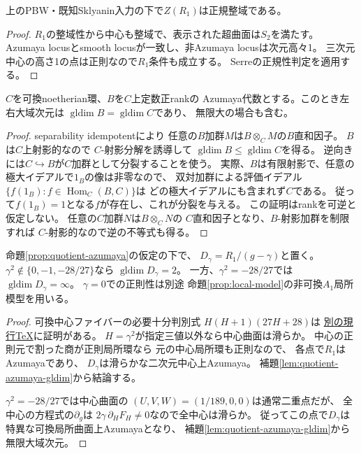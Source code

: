 \begin{corollary}[全中心の正規性]
\label{cor:quotient-normal-center}
上のPBW・既知Sklyanin入力の下で$Z(R_1)$は正規整域である。
\end{corollary}
\begin{proof}
$R_1$の整域性から中心も整域で、表示された超曲面は$S_2$を満たす。
Azumaya locusとsmooth locusが一致し、非Azumaya locusは次元高々1。
三次元中心の高さ1の点は正則なので$R_1$条件も成立する。
Serreの正規性判定を適用する。
\end{proof}


\begin{lemma}[Azumaya環と中心の大域次元]
\label{lem:quotient-azumaya-gldim}
$C$を可換noetherian環、$B$を$C$上定数正rankの
Azumaya代数とする。このとき左右大域次元は
$\operatorname{gldim}B=\operatorname{gldim}C$であり、
無限大の場合も含む。
\end{lemma}
\begin{proof}
separability idempotentにより
任意の$B$加群$M$は$B\otimes_CM$の$B$直和因子。
$B$は$C$上射影的なので
$C$-射影分解を誘導して
$\operatorname{gldim}B\le\operatorname{gldim}C$を得る。
逆向きには$C\hookrightarrow B$が$C$加群として分裂することを使う。
実際、$B$は有限射影で、任意の極大イデアルで$1_B$の像は非零なので、
双対加群による評価イデアル$\{f(1_B):f\in\operatorname{Hom}_C(B,C)\}$は
どの極大イデアルにも含まれず$C$である。
従って$f(1_B)=1$となる$f$が存在し、これが分裂を与える。
この証明はrankを可逆と仮定しない。
任意の$C$加群$N$は$B\otimes_CN$の
$C$直和因子となり、$B$-射影加群を制限すれば
$C$-射影的なので逆の不等式も得る。
\end{proof}

\begin{corollary}[可換中心ファイバーからの十分条件と一つの非正則値]
\label{cor:quotient-azumaya-fibers}
命題\ref{prop:quotient-azumaya}の仮定の下で、
$D_\gamma=R_1/(g-\gamma)$と置く。
$\gamma^2\notin\{0,-1,-28/27\}$なら
$\operatorname{gldim}D_\gamma=2$。
一方、$\gamma^2=-28/27$では
$\operatorname{gldim}D_\gamma=\infty$。
$\gamma=0$での正則性は別途
命題\ref{prop:local-model}の非可換$A_1$局所模型を用いる。
\end{corollary}
\begin{proof}
可換中心ファイバーの必要十分判別式
$H(H+1)(27H+28)$は
\href{https://github.com/uedakazushi/cayley-sklyanin/blob/main/papers/central_fiber_discriminant.tex}
{別の現行TeX}に証明がある。
$H=\gamma^2$が指定三値以外なら中心曲面は滑らか。
中心の正則元で割った商が正則局所環なら
元の中心局所環も正則なので、
各点で$R_1$はAzumayaであり、
$D_\gamma$は滑らかな二次元中心上Azumaya。
補題\ref{lem:quotient-azumaya-gldim}から結論する。

$\gamma^2=-28/27$では中心曲面の
$(U,V,W)=(1/189,0,0)$は通常二重点だが、
全中心の方程式の$\partial_g$は
$2\gamma\,\partial_HF_H\ne0$なので全中心は滑らか。
従ってこの点で$D_\gamma$は
特異な可換局所曲面上Azumayaとなり、
補題\ref{lem:quotient-azumaya-gldim}から無限大域次元。
\end{proof}
